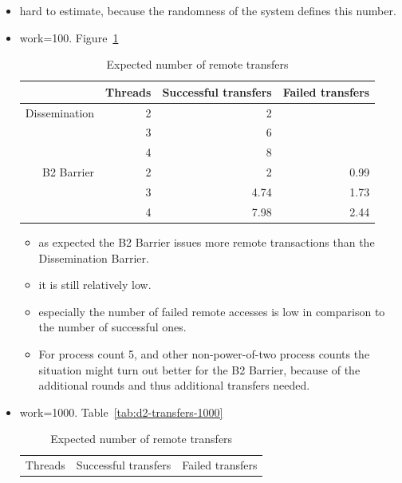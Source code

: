 \documentclass[a4paper, 10pt]{article}
\begin{document}
\begin{itemize}
\begin{itemize}
			\item hard to estimate, because the randomness of the system defines this number.
			\item work=100. Figure~\ref{tab:d2-transfers-100}
				\begin{table}[htbp]
					\centering
					\caption{Expected number of remote transfers}
					\vspace{0.2cm}
					\begin{tabular}{r | r | r r}
						              & Threads & Successful transfers & Failed transfers \\
						\hline
						Dissemination & 2       & 2                     &                 \\
						              & 3       & 6                     &                 \\
						              & 4       & 8                     &                 \\
						\hline
						B2 Barrier    & 2       & 2                     & 0.99            \\
						              & 3       & 4.74                  & 1.73            \\
						              & 4       & 7.98                  & 2.44            \\
					\end{tabular}
					\label{tab:d2-transfers-100}
				\end{table}
				\begin{itemize}
					\item as expected the B2 Barrier issues more remote transactions than the Dissemination Barrier.
					\item it is still relatively low.
					\item especially the number of failed remote accesses is low in comparison to the number of successful ones.
					\item For process count 5, and other non-power-of-two process counts the situation might turn out better for the B2 Barrier, because of the additional rounds and thus additional transfers needed.
				\end{itemize}
			\item work=1000. Table~\ref{tab:d2-transfers-1000}
				\begin{table}[htbp]
					\centering
					\caption{Expected number of remote transfers}
					\vspace{0.2cm}
					\begin{tabular}{r | r r}
						Threads & Successful transfers & Failed transfers \\

\end{tabular}
\end{table}
\end{itemize}
\end{itemize}
\end{document}
